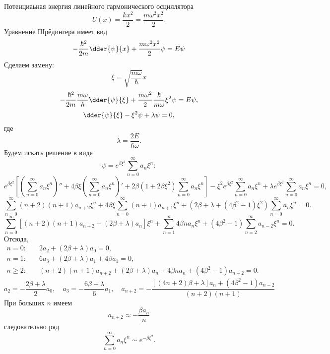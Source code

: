 Потенциаьная энергия линейного гармонического осциллятора
\[
    U(x) = \frac{kx^2}{2} = \frac{m\omega^2x^2}{2}.
\]
Уравнение Шрёдингера имеет вид
\begin{equation}
    -\frac{\hbar^2}{2m}\dder{\psi}{x} + \frac{m\omega^2x^2}{2}\psi = E\psi
    \label{eq:12:schrodinger}
\end{equation}
Сделаем замену:
\begin{equation}
    \xi = \sqrt{\frac{m\omega}{\hbar}}x
    \label{eq:12:replacement}
\end{equation}
\[
    -\frac{\hbar^2}{2m}\frac{m\omega}{\hbar}\dder{\psi}{\xi} +
    \frac{m\omega^2}{2}\frac{\hbar}{m\omega}\xi^2\psi = E\psi,
\]
\begin{equation}
    \dder{\psi}{\xi} - \xi^2\psi + \lambda\psi = 0,
    \label{eq:12}
\end{equation}
где
\[
    \lambda = \frac{2E}{\hbar\omega}.
\]
Будем искать решение в виде
\begin{equation}
    \psi = e^{\beta \xi^2}\sum_{n=0}^{\infty} a_n\xi^n:
    \label{eq:12:solution}
\end{equation}
\[
    e^{\beta\xi^2}\left[ \left(\sum_{n=0}^{\infty} a_n\xi^n\right)''
    + 4\beta\xi\left(\sum_{n=0}^{\infty} a_n\xi^n\right)' +
    2\beta(1+2\beta\xi^2)\sum_{n=0}^{\infty} a_n\xi^n\right] -
    \xi^2e^{\beta \xi^2}\sum_{n=0}^{\infty} a_n\xi^n +
    \lambda e^{\beta \xi^2}\sum_{n=0}^{\infty} a_n\xi^n = 0,
\]
\[
    \sum_{n=0}^{\infty} (n+2)(n+1)a_{n+2}\xi^n
    + 4\beta\xi\sum_{n=0}^{\infty} (n+1)a_{n+1}\xi^n +
    (2\beta+\lambda+(4\beta^2-1)\xi^2)\sum_{n=0}^{\infty} a_n\xi^n = 0.
\]
\[
    \sum_{n=0}^{\infty} [(n+2)(n+1)a_{n+2} + (2\beta+\lambda) a_n] \xi^n +
    \sum_{n=1}^{\infty} 4\beta na_n\xi^n +
    (4\beta^2-1)\sum_{n=2}^{\infty} a_{n-2}\xi^n = 0.
\]
Отсюда,
\begin{align*}
    n=0: &\quad 2a_2 + (2\beta+\lambda)a_0 = 0, \\
    n=1: &\quad 6a_3 + (2\beta+\lambda)a_1 + 4\beta a_1 = 0,\\
    n\ge2: &\quad (n+2)(n+1)a_{n+2} + (2\beta+\lambda) a_n + 4\beta na_n +
    (4\beta^2-1)a_{n-2} = 0.
\end{align*}
\[
    a_2 = -\frac{2\beta+\lambda}{2}a_0,\quad
    a_3 = -\frac{6\beta+\lambda}{6}a_1,\quad
    a_{n+2} = -\frac{[(4n+2)\beta+\lambda] a_n + (4\beta^2-1)a_{n-2}}
    {(n+2)(n+1)}
\]
При больших \(n\) имеем
\[
    a_{n+2} \approx -\frac{\beta a_n}{n}
\]
следовательно ряд
\[
    \sum_{n=0}^{\infty} a_n\xi^n \sim e^{-\beta \xi^2}.
\]
